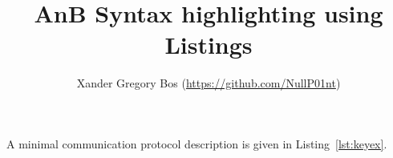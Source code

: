 \documentclass[a4paper,11pt]{article}
\title{AnB Syntax highlighting using Listings}
\author{Xander Gregory Bos (\url{https://github.com/NullP01nt})}
\begin{document}
\maketitle

A minimal communication protocol description is given in Listing~\ref{lst:keyex}.

\end{document}
